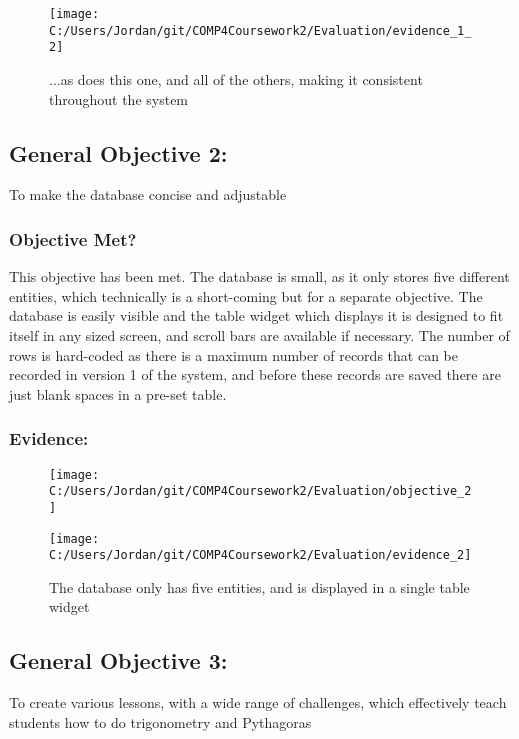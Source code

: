 \begin{figure}[H]
	\texttt{[image: C:/Users/Jordan/git/COMP4Coursework2/Evaluation/evidence\_1\_2]}
	\caption{...as does this one, and all of the others, making it consistent throughout the system} 
\end{figure}

\subsection{General Objective 2: }

To make the database concise and adjustable

\subsubsection{Objective Met?}

This objective has been met. The database is small, as it only stores five different entities, which technically is a short-coming but for a separate objective. The database is easily visible and the table widget which displays it is designed to fit itself in any sized screen, and scroll bars are available if necessary. The number of rows is hard-coded as there is a maximum number of records that can be recorded in version 1 of the system, and before these records are saved there are just blank spaces in a pre-set table.

\subsubsection{Evidence: }

\begin{figure}[H]
	\texttt{[image: C:/Users/Jordan/git/COMP4Coursework2/Evaluation/objective\_2]}
\end{figure}

\begin{figure}[H]
	\texttt{[image: C:/Users/Jordan/git/COMP4Coursework2/Evaluation/evidence\_2]}
	\caption{The database only has five entities, and is displayed in a single table widget}
\end{figure}

\subsection{General Objective 3: }

To create various lessons, with a wide range of challenges, which effectively teach students how to do trigonometry and Pythagoras

